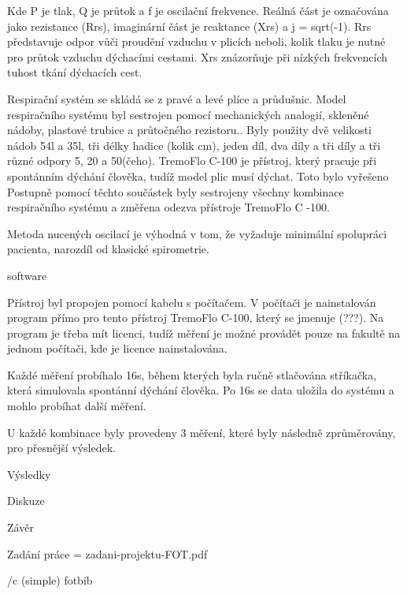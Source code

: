 Kde P je tlak, Q je průtok a f je oscilační frekvence. Reálná část je označována jako rezistance (Rrs), imaginární část je reaktance (Xrs) a j = sqrt(-1). 
Rrs představuje odpor vůči proudění vzduchu v plicích neboli, kolik tlaku je nutné pro průtok vzduchu dýchacími cestami. Xrs znázorňuje při nízkých frekvencích tuhost tkání dýchacích cest. 

 
Respirační systém se skládá se z pravé a levé plíce a průdušnic. Model respiračního systému  byl sestrojen pomocí mechanických analogií, skleněné nádoby, plastové trubice a průtočného rezistoru..  Byly použity dvě velikosti nádob 54l a 35l, tři délky hadice (kolik cm), jeden díl, dva díly a tři díly a tři různé odpory 5, 20 a 50(čeho). 
TremoFlo C-100 je přístroj, který pracuje při spontánním dýchání člověka, tudíž model plic musí dýchat. Toto bylo vyřešeno  
Postupně pomocí těchto součástek byly sestrojeny všechny kombinace respiračního systému a změřena odezva přístroje TremoFlo C -100. 

Metoda nucených oscilací je výhodná v tom, že vyžaduje minimální spolupráci pacienta, narozdíl od klasické spirometrie. 

software 

Přístroj byl propojen pomocí kabelu s počítačem. V počítači je nainstalován program přímo pro tento přístroj TremoFlo C-100, který se jmenuje (???). Na program je třeba mít licenci, tudíž měření je možné provádět pouze na fakultě na jednom počítači, kde je licence nainstalována. 


Každé měření probíhalo 16s, během kterých byla ručně stlačována stříkačka, která simulovala spontánní dýchání člověka. Po 16s se data uložila do systému a mohlo probíhat další měření. 

U každé kombinace byly provedeny 3 měření, které byly následně zprůměrovány, pro přesnější výsledek. 


\chap Výsledky

\chap Diskuze

\chap Závěr

\app Zadání práce
\picw=\hsize %
\cinspic zadani-projektu-FOT.pdf


\bibchap
\usebib/c (simple) fotbib

\bye
